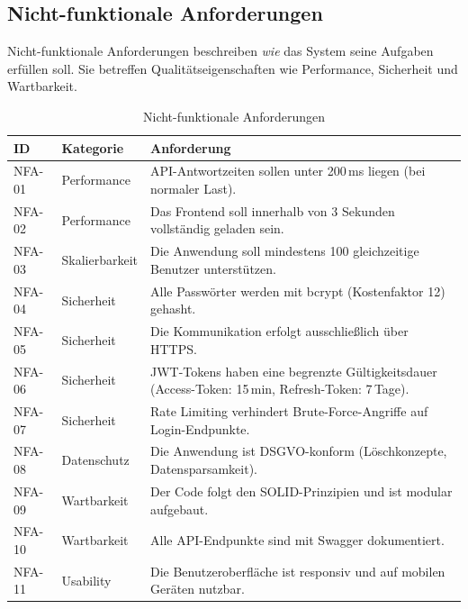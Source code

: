 \subsection{Nicht-funktionale Anforderungen}
\label{sec:nichtfunktionale-anforderungen}

Nicht-funktionale Anforderungen beschreiben \textit{wie} das System
seine Aufgaben erfüllen soll. Sie betreffen Qualitätseigenschaften
wie Performance, Sicherheit und Wartbarkeit.

\begin{table}[H]
    \centering
    \caption{Nicht-funktionale Anforderungen}
    \begin{tabularx}{\textwidth}{llX}
        \toprule
        \textbf{ID} & \textbf{Kategorie} & \textbf{Anforderung} \\
        \midrule
        NFA-01 & Performance
          & API-Antwortzeiten sollen unter 200\,ms liegen
            (bei normaler Last). \\
        NFA-02 & Performance
          & Das Frontend soll innerhalb von 3 Sekunden vollständig
            geladen sein. \\
        NFA-03 & Skalierbarkeit
          & Die Anwendung soll mindestens 100 gleichzeitige
            Benutzer unterstützen. \\
        NFA-04 & Sicherheit
          & Alle Passwörter werden mit bcrypt (Kostenfaktor 12)
            gehasht. \\
        NFA-05 & Sicherheit
          & Die Kommunikation erfolgt ausschließlich über HTTPS. \\
        NFA-06 & Sicherheit
          & \gls{JWT}-Tokens haben eine begrenzte Gültigkeitsdauer
            (Access-Token: 15\,min, Refresh-Token: 7\,Tage). \\
        NFA-07 & Sicherheit
          & Rate Limiting verhindert Brute-Force-Angriffe
            auf Login-Endpunkte. \\
        NFA-08 & Datenschutz
          & Die Anwendung ist \gls{DSGVO}-konform (Löschkonzepte,
            Datensparsamkeit). \\
        NFA-09 & Wartbarkeit
          & Der Code folgt den SOLID-Prinzipien und ist modular
            aufgebaut. \\
        NFA-10 & Wartbarkeit
          & Alle API-Endpunkte sind mit Swagger dokumentiert. \\
        NFA-11 & Usability
          & Die Benutzeroberfläche ist responsiv und auf mobilen
            Geräten nutzbar. \\

\end{tabularx}
\end{table}
